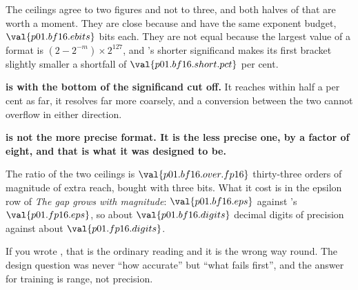 \begin{fr}
The ceilings agree to two figures and not to three, and both halves of that
are worth a moment. They are close because  and  have
the same exponent budget, $\val{p01.bf16.ebits}$ bits each. They are not equal
because the largest value of a format is $(2 - 2^{-m}) \times 2^{127}$, and
's shorter significand makes its first bracket slightly smaller
\dash{} a shortfall of $\val{p01.bf16.short.pct}$ per cent.

\textbf{ is  with the bottom of the significand cut
off.} It reaches within half a per cent as far, it resolves far more coarsely,
and a conversion between the two cannot overflow in either direction.

\begin{trapbox}
\textbf{ is not the more precise format. It is the less precise
one, by a factor of eight, and that is what it was designed to be.}

The ratio of the two ceilings is $\val{p01.bf16.over.fp16}$ \dash{}
thirty-three orders of magnitude of extra reach, bought with three bits. What
it cost is in the epsilon row of \emph{The gap grows with magnitude}:
$\val{p01.bf16.eps}$ against 's $\val{p01.fp16.eps}$, so about
$\val{p01.bf16.digits}$ decimal digits of precision against about
$\val{p01.fp16.digits}$.

If you wrote , that is the ordinary reading and it is the wrong
way round. The design question was
never \enquote{how accurate} but \enquote{what fails first}, and the answer
for training is range, not precision.
\end{trapbox}
\end{fr}

